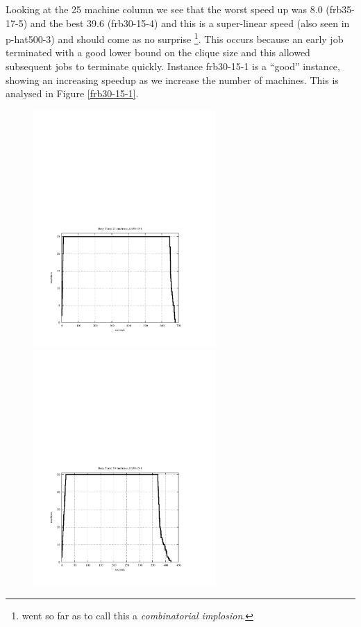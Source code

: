 \documentclass{l4proj}
\begin{document}
Looking at the 25 machine column we see that the worst speed up was 8.0 (frb35-17-5) and the best 39.6 (frb30-15-4) 
and this is a super-linear speed (also seen in p-hat500-3) and should come as no 
surprise \cite{herbSutter,clearwater}\footnote{\cite{clearwater} went so far as to call this a \emph{combinatorial implosion}.}.
This occurs because an early job terminated with a good lower 
bound on the clique size and this
allowed subsequent jobs to terminate quickly. Instance frb30-15-1 is a ``good'' instance, showing an increasing
speedup as we increase the number of machines. This is analysed in Figure \ref{frb30-15-1}.

\begin{figure}
\vspace{-4.5cm}
\begin{center}
\hspace{-1.5cm}
\begin{minipage}[t]{0.30\textwidth}
\includegraphics[height=9.0cm]{busy-run25-frb30-15-1.pdf}
\end{minipage}
\hfill
\begin{minipage}[t]{0.30\textwidth}
\includegraphics[height=9.0cm]{busy-run50-frb30-15-1.pdf}

\end{minipage}
\end{center}
\end{figure}
\end{document}
